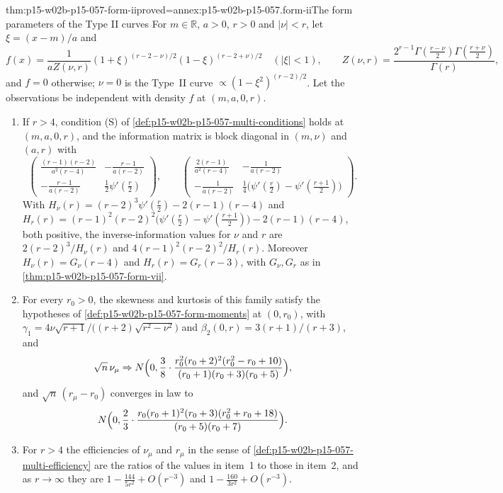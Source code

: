 \begin{hbtheorem}{thm:p15-w02b-p15-057-form-ii}{proved=annex:p15-w02b-p15-057.form-ii}{The form parameters of the Type II curves}
For \(m\in\mathbb R\), \(a>0\), \(r>0\) and \(|\nu|<r\), let
\(\xi=(x-m)/a\) and
\[
 f(x)=\frac1{aZ(\nu,r)}(1+\xi)^{(r-2-\nu)/2}(1-\xi)^{(r-2+\nu)/2}
 \quad(|\xi|<1),\qquad
 Z(\nu,r)=\frac{2^{r-1}\Gamma(\frac{r-\nu}2)\Gamma(\frac{r+\nu}2)}{\Gamma(r)},
\]
and \(f=0\) otherwise; \(\nu=0\) is the Type~II curve
\(\propto(1-\xi^2)^{(r-2)/2}\). Let the observations be independent with
density \(f\) at \((m,a,0,r)\).
\begin{enumerate}
\item If \(r>4\), condition (S) of
 \cref{def:p15-w02b-p15-057-multi-conditions} holds at \((m,a,0,r)\), and
 the information matrix is block diagonal in \((m,\nu)\) and \((a,r)\)
 with
 \[
  \begin{pmatrix}\frac{(r-1)(r-2)}{a^2(r-4)}&-\frac{r-1}{a(r-2)}\\
  -\frac{r-1}{a(r-2)}&\frac12\psi'(\frac r2)\end{pmatrix},\qquad
  \begin{pmatrix}\frac{2(r-1)}{a^2(r-4)}&-\frac1{a(r-2)}\\
  -\frac1{a(r-2)}&\frac14\bigl(\psi'(\frac r2)-\psi'(\frac{r+1}2)\bigr)
  \end{pmatrix}.
 \]
 With \(H_\nu(r)=(r-2)^3\psi'(\frac r2)-2(r-1)(r-4)\) and
 \(H_r(r)=(r-1)^2(r-2)^2\bigl(\psi'(\frac r2)-\psi'(\frac{r+1}2)\bigr)
 -2(r-1)(r-4)\), both positive, the inverse-information values for
 \(\nu\) and \(r\) are \(2(r-2)^3/H_\nu(r)\) and
 \(4(r-1)^2(r-2)^2/H_r(r)\). Moreover \(H_\nu(r)=G_\nu(r-4)\) and
 \(H_r(r)=G_r(r-3)\), with \(G_\nu,G_r\) as in
 \cref{thm:p15-w02b-p15-057-form-vii}.
\item For every \(r_0>0\), the skewness and kurtosis of this family
 satisfy the hypotheses of \cref{def:p15-w02b-p15-057-form-moments} at
 \((0,r_0)\), with
 \(\gamma_1=4\nu\sqrt{r+1}\big/\bigl((r+2)\sqrt{r^2-\nu^2}\bigr)\) and
 \(\beta_2(0,r)=3(r+1)/(r+3)\), and
 \[
  \sqrt n\,\nu_\mu\Rightarrow N\Bigl(0,\frac38\cdot
  \frac{r_0^2(r_0+2)^2(r_0^2-r_0+10)}{(r_0+1)(r_0+3)(r_0+5)}\Bigr),
 \]
 and \(\sqrt n\,(r_\mu-r_0)\) converges in law to
 \[
  N\Bigl(0,\frac23\cdot
  \frac{r_0(r_0+1)^2(r_0+3)(r_0^2+r_0+18)}{(r_0+5)(r_0+7)}\Bigr).
 \]
\item For \(r>4\) the efficiencies of \(\nu_\mu\) and \(r_\mu\) in the sense
 of \cref{def:p15-w02b-p15-057-multi-efficiency} are the ratios of the
 values in item~1 to those in item~2, and as \(r\to\infty\) they are
 \(1-\frac{144}{5r^2}+O(r^{-3})\) and \(1-\frac{160}{3r^2}+O(r^{-3})\).
\end{enumerate}
\end{hbtheorem}

